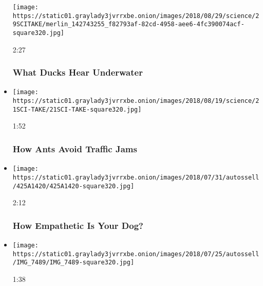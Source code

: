 \begin{itemize}
  \texttt{[image: https://static01.graylady3jvrrxbe.onion/images/2018/08/29/science/29SCITAKE/merlin\_142743255\_f82793af-82cd-4958-aee6-4fc390074acf-square320.jpg]}

  2:27

  \hypertarget{what-ducks-hear-underwater}{%
  \subsubsection{What Ducks Hear
  Underwater}\label{what-ducks-hear-underwater}}
\item
  \href{https://www.nytimes3xbfgragh.onion/video/science/100000006037692/how-ants-avoid-traffic-jams.html?action=click\&module=video-series-bar\&region=header\&pgtype=Article\&playlistId=video/sciencetake}{}

  \texttt{[image: https://static01.graylady3jvrrxbe.onion/images/2018/08/19/science/21SCI-TAKE/21SCI-TAKE-square320.jpg]}

  1:52

  \hypertarget{how-ants-avoid-traffic-jams}{%
  \subsubsection{How Ants Avoid Traffic
  Jams}\label{how-ants-avoid-traffic-jams}}
\item
  \href{https://www.nytimes3xbfgragh.onion/video/science/100000006018081/how-empathetic-is-your-dog.html?action=click\&module=video-series-bar\&region=header\&pgtype=Article\&playlistId=video/sciencetake}{}

  \texttt{[image: https://static01.graylady3jvrrxbe.onion/images/2018/07/31/autossell/425A1420/425A1420-square320.jpg]}

  2:12

  \hypertarget{how-empathetic-is-your-dog}{%
  \subsubsection{How Empathetic Is Your
  Dog?}\label{how-empathetic-is-your-dog}}
\item
  \href{https://www.nytimes3xbfgragh.onion/video/science/100000005998094/the-hidden-power-of-squirting-fruit.html?action=click\&module=video-series-bar\&region=header\&pgtype=Article\&playlistId=video/sciencetake}{}

  \texttt{[image: https://static01.graylady3jvrrxbe.onion/images/2018/07/25/autossell/IMG\_7489/IMG\_7489-square320.jpg]}

  1:38


\end{itemize}
